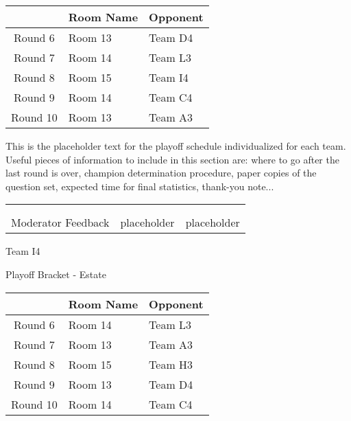 \documentclass{article}%
\begin{document}
\vspace*{4pt}%
%
\begin{tabularx}{\textwidth}{|c|Y|Y|}%
\hline%
&Room Name&Opponent\\%
\hline%
Round 6&Room 13&Team D4\\%
Round 7&Room 14&Team L3\\%
Round 8&Room 15&Team I4\\%
Round 9&Room 14&Team C4\\%
Round 10&Room 13&Team A3\\%
\hline%
\end{tabularx}%
\vspace*{30pt}%
\linebreak%
This is the placeholder text for the playoff schedule individualized for each team. Useful pieces of information to include in this section are: where to go after the last round is over, champion determination procedure, paper copies of the question set, expected time for final statistics, thank{-}you note...%
\vspace*{30pt}%
\newline%
%
\begin{tabularx}{\textwidth}{YYY}%
  &  &  \\%
\\%
Moderator Feedback&placeholder&placeholder\\%
\end{tabularx}%
\newpage%
\begin{center}%
\begin{Huge}%
Team I4%
\end{Huge}%
\vspace*{12pt}%
\linebreak%
\begin{Large}%
Playoff Bracket {-} Estate%
\end{Large}%
\end{center}%
\vspace*{4pt}%
%
\begin{tabularx}{\textwidth}{|c|Y|Y|}%
\hline%
&Room Name&Opponent\\%
\hline%
Round 6&Room 14&Team L3\\%
Round 7&Room 13&Team A3\\%
Round 8&Room 15&Team H3\\%
Round 9&Room 13&Team D4\\%
Round 10&Room 14&Team C4\\%
\hline%
\end{tabularx}%
\end{document}
